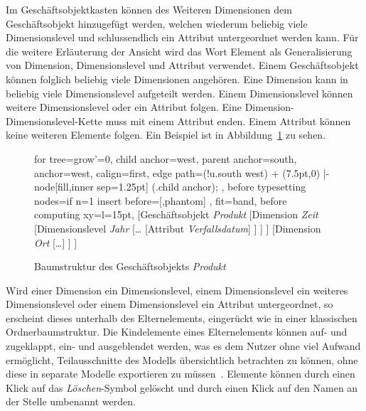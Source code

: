 \documentclass[
  language=german, %
  type=bachelor,%
  ngerman
]{isthesis}
\begin{document}
\begin{content}
  Im Geschäftsobjektkasten können des Weiteren Dimensionen dem Geschäftsobjekt
  hinzugefügt werden, welchen wiederum beliebig viele Dimensionslevel und
  schlussendlich ein Attribut untergeordnet werden kann. Für die weitere
  Erläuterung der Ansicht wird das Wort Element als Generalisierung von
  Dimension, Dimensionslevel und Attribut verwendet.  Einem
  Geschäftsobjekt können folglich beliebig viele Dimensionen angehören. Eine
  Dimension kann in beliebig viele Dimensionslevel aufgeteilt werden. Einem
  Dimensionslevel können weitere Dimensionslevel oder ein Attribut folgen. Eine
  Dimension-Dimensionslevel-Kette muss mit einem Attribut enden. Einem Attribut
  können keine weiteren Elemente folgen. Ein Beispiel ist in
  Abbildung~\ref{fig:baumstruktur-produkt} zu sehen.

	\begin{figure}
		\footnotesize

		\begin{forest}
			for tree={grow'=0,
				child anchor=west,
				parent anchor=south,
				anchor=west,
				calign=first,
				edge path={\noexpand{}
					(!u.south west) + (7.5pt,0) |- node[fill,inner sep=1.25pt] {} (.child anchor);
				},
				before typesetting nodes={if n=1
						{insert before={[,phantom]}}
						{}
				},
				fit=band,
				before computing xy={l=15pt},
			}
		[Geschäftsobjekt \textit{Produkt}
			[Dimension \textit{Zeit}
				[Dimensionslevel \textit{Jahr}
					[\ldots{}
						[Attribut \textit{Verfallsdatum}]
					]
				]
			]
			[Dimension \textit{Ort}
				[\ldots{}]
			]
		]
		\end{forest}
    \caption{Baumstruktur des Geschäftsobjekts \textit{Produkt}}\label{fig:baumstruktur-produkt}
	\end{figure}

  Wird einer Dimension ein Dimensionslevel, einem Dimensionslevel ein weiteres
  Dimensionslevel oder einem Dimensionslevel ein Attribut untergeordnet, so
  erscheint dieses unterhalb des Elternelements, eingerückt wie in einer
  klassischen Ordnerbaumstruktur. Die Kindelemente eines Elternelements können
  auf- und zugeklappt, \bzw{} ein- und ausgeblendet werden, was es dem Nutzer
  ohne viel Aufwand ermöglicht, Teilausschnitte des Modells übersichtlich
  betrachten zu können, ohne diese in separate Modelle exportieren zu
  müssen~\cite[][S. 6 f.]{fleischer2013konstruktion}. Elemente können durch einen Klick auf
  das \textit{Löschen}-Symbol gelöscht und durch einen Klick auf den Namen an
  der Stelle umbenannt werden.


\end{content}
\end{document}
